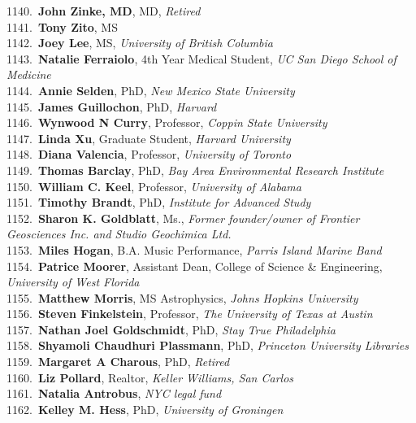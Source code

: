 1140.~{\bf John Zinke, MD}, MD, {\sl Retired} \\
1141.~{\bf Tony Zito}, MS \\
1142.~{\bf Joey Lee}, MS, {\sl University of British Columbia} \\
1143.~{\bf Natalie Ferraiolo}, 4th Year Medical Student, {\sl UC San Diego School of Medicine} \\
1144.~{\bf Annie Selden}, PhD, {\sl New Mexico State University} \\
1145.~{\bf James Guillochon}, PhD, {\sl Harvard} \\
1146.~{\bf Wynwood N Curry}, Professor, {\sl Coppin State University} \\
1147.~{\bf Linda Xu}, Graduate Student, {\sl Harvard University} \\
1148.~{\bf Diana Valencia}, Professor, {\sl University of Toronto} \\
1149.~{\bf Thomas Barclay}, PhD, {\sl Bay Area Environmental Research Institute} \\
1150.~{\bf William C. Keel}, Professor, {\sl University of Alabama} \\
1151.~{\bf Timothy Brandt}, PhD, {\sl Institute for Advanced Study} \\
1152.~{\bf Sharon K. Goldblatt}, Ms., {\sl Former founder/owner of Frontier Geosciences Inc. and Studio Geochimica Ltd.} \\
1153.~{\bf Miles Hogan}, B.A. Music Performance, {\sl Parris Island Marine Band} \\
1154.~{\bf Patrice Moorer}, Assistant Dean, College of Science \& Engineering, {\sl University of West Florida} \\
1155.~{\bf Matthew Morris}, MS Astrophysics, {\sl Johns Hopkins University} \\
1156.~{\bf Steven Finkelstein}, Professor, {\sl The University of Texas at Austin} \\
1157.~{\bf Nathan Joel Goldschmidt}, PhD, {\sl Stay True Philadelphia} \\
1158.~{\bf Shyamoli Chaudhuri Plassmann}, PhD, {\sl Princeton University Libraries} \\
1159.~{\bf Margaret A Charous}, PhD, {\sl Retired} \\
1160.~{\bf Liz Pollard}, Realtor, {\sl Keller Williams, San Carlos} \\
1161.~{\bf Natalia Antrobus}, {\sl NYC legal fund} \\
1162.~{\bf Kelley M. Hess}, PhD, {\sl University of Groningen} \\
